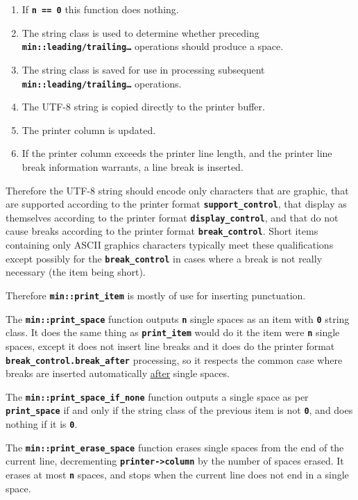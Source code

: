 \documentclass[12pt]{article}
\newcommand{\TT}[1]{{\tt \bfseries #1}}
\newcommand{\EOL}{\penalty \exhyphenpenalty}
\begin{document}
\begin{enumerate}
\item If \TT{n == 0} this function does nothing.
\item The string class is used to determine whether preceding
\TT{min::\EOL leading/\EOL trailing\ldots} operations should
produce a space.
\item The string class is saved for use in processing subsequent
\TT{min::\EOL leading/\EOL trailing\ldots} operations.
\item The UTF-8 string is copied directly to the printer buffer.
\item The printer column is updated.
\item If the printer column exceeds the printer line length,
and the printer line break information warrants, a line break
is inserted.
\end{enumerate}

Therefore the UTF-8 string should encode only characters
that are graphic, that are supported according to
the printer format \TT{support\_\EOL control},
that display as themselves according to the
printer format \TT{display\_\EOL control},
and that do not cause breaks according to the
printer format \TT{break\_\EOL control}.
Short items containing only ASCII graphics characters
typically meet these qualifications except possibly for
the \TT{break\_\EOL control} in cases where a break is not
really necessary (the item being short).

Therefore \TT{min::print\_item} is mostly of use for inserting
punctuation.

The \TT{min::print\_space} function outputs \TT{n} single spaces
as an item with \TT{0} string class.  It does the same thing
as \TT{print\_item} would do it the item were \TT{n} single spaces,
except it does not insert line breaks and it does do the
printer format \TT{break\_\EOL control.break\_\EOL after}
processing, so it respects the common case where breaks are inserted
automatically \underline{after} single spaces.

The \TT{min::print\_space\_if\_none} function outputs a single space
as per \TT{print\_space} if and only if the string class of the
previous item is not \TT{0}, and does nothing if it is \TT{0}.

The \TT{min::print\_erase\_space} function erases single spaces from
the end of the current line, decrementing \TT{printer->column} by the
number of spaces erased.  It erases at most \TT{n} spaces, and stops
when the current line does not end in a single space.
\end{document}
